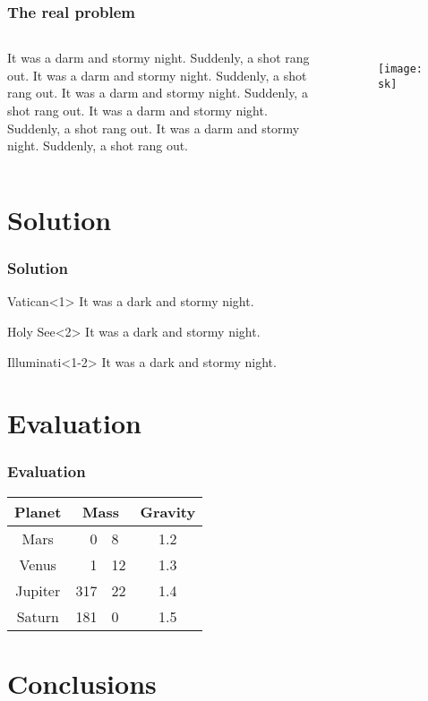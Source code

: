 \documentclass{beamer}
\begin{document}
\begin{frame}
	\frametitle{The real problem}
	\begin{columns}
		It was a darm and stormy night.  Suddenly, a shot rang out.
		It was a darm and stormy night.  Suddenly, a shot rang out.
		It was a darm and stormy night.  Suddenly, a shot rang out.
		It was a darm and stormy night.  Suddenly, a shot rang out.
		It was a darm and stormy night.  Suddenly, a shot rang out.
		\begin{figure}
			\texttt{[image: sk]}
		\end{figure}
	\end{columns}
\end{frame}

\section{Solution}

\begin{frame}
	\frametitle{Solution}

	\begin{block}{Vatican}<1>
		It was a dark and stormy night.
	\end{block}

	\begin{alertblock}{Holy See}<2>
		It was a dark and stormy night.
	\end{alertblock}

	\begin{example}{Illuminati}<1-2>
		It was a dark and stormy night.
	\end{example}

\end{frame}

\section{Evaluation}

\begin{frame}
	\frametitle{Evaluation}
	\begin{center}
		\begin{tabular}{cr@{.}lc}
			\hline
			Planet & \multicolumn{2}{c}{Mass} & Gravity \\
			\hline
			Mars    &    0&8 &  1.2 \\
			Venus   &   1&12 &  1.3 \\
			Jupiter & 317&22 & 1.4 \\
			Saturn  &  181&0 & 1.5 \\
			\hline
		\end{tabular}
	\end{center}
\end{frame}

\section{Conclusions}

\begin{frame}
\end{frame}
\end{document}
